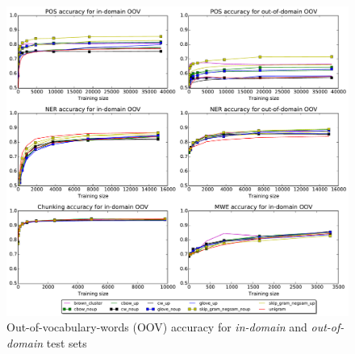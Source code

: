 \begin{figure}
\centering
\caption{Out-of-vocabulary-words (OOV) accuracy for \textit{in-domain} and \textit{out-of-domain} test sets}
\label{OOV} 
    	\includegraphics[scale=0.5]{plots/OOV-plots}
\end{figure}



